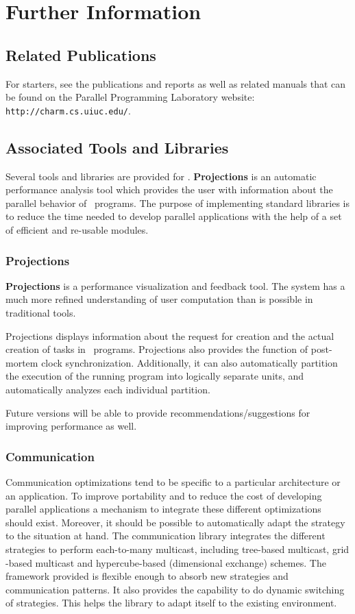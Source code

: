 \chapter{Further Information}

\section{Related Publications}
\label{publications}

For starters, see the publications and reports as well
as related manuals that can be found on the Parallel Programming
Laboratory website: {\tt http://charm.cs.uiuc.edu/}. 

\section{Associated Tools and Libraries}

Several tools and libraries are provided for \charmpp. {\bf
Projections} is an automatic performance analysis tool which provides
the user with information about the parallel behavior of \charmpp\ programs. The purpose of implementing \charmpp standard
libraries is to reduce the time needed to develop parallel
applications with the help of a set of efficient and re-usable modules.

\subsection{Projections}
{\bf Projections} is a
performance visualization and feedback tool. The system has a much
more refined understanding of user computation than is possible in
traditional tools.

Projections displays information about the request for creation and
the actual creation of tasks in \charmpp\ programs. Projections also
provides the function of post-mortem clock
synchronization. Additionally, it can also automatically partition
the execution of the running program into logically separate units,
and automatically analyzes each individual partition. 

Future versions will be able to provide recommendations/suggestions
for improving performance as well.

\subsection{Communication}
Communication optimizations tend to be specific to a particular
architecture or an application. To improve portability and to reduce the
cost of developing parallel applications a mechanism to integrate these
different optimizations should exist. Moreover, it should be possible to
automatically adapt the strategy to the situation at hand. The
communication library integrates the different strategies to perform
each-to-many multicast, including tree-based multicast, grid -based
multicast and hypercube-based (dimensional exchange) schemes. The
framework provided is flexible enough to absorb new strategies and
communication patterns. It also provides the capability to do dynamic
switching of strategies. This helps the library to adapt itself to the
existing environment.

